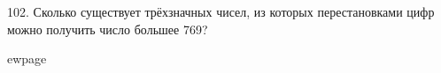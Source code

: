 102. Сколько существует трёхзначных чисел, из которых перестановками цифр можно получить число большее 769?

ewpage
